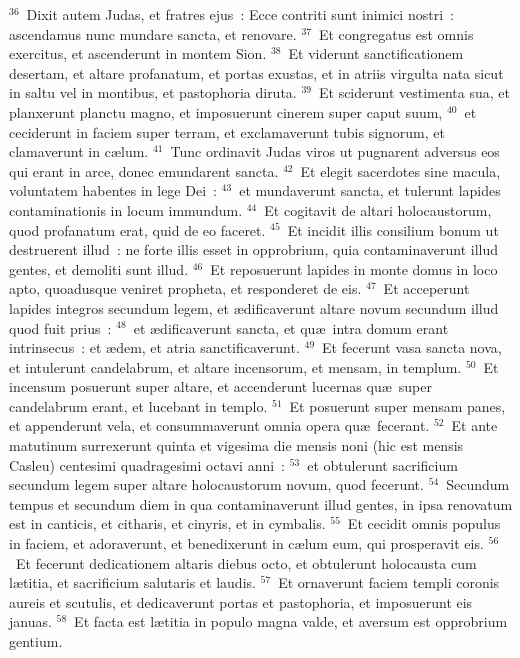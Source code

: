 ${}^{36}$~Dixit autem Judas, et fratres ejus~: Ecce contriti sunt inimici nostri~: ascendamus nunc mundare sancta, et renovare.
${}^{37}$~Et congregatus est omnis exercitus, et ascenderunt in montem Sion.
${}^{38}$~Et viderunt sanctificationem desertam, et altare profanatum, et portas exustas, et in atriis virgulta nata sicut in saltu vel in montibus, et pastophoria diruta.
${}^{39}$~Et sciderunt vestimenta sua, et planxerunt planctu magno, et imposuerunt cinerem super caput suum,
${}^{40}$~et ceciderunt in faciem super terram, et exclamaverunt tubis signorum, et clamaverunt in c\ae lum.
${}^{41}$~Tunc ordinavit Judas viros ut pugnarent adversus eos qui erant in arce, donec emundarent sancta.
${}^{42}$~Et elegit sacerdotes sine macula, voluntatem habentes in lege Dei~:
${}^{43}$~et mundaverunt sancta, et tulerunt lapides contaminationis in locum immundum.
${}^{44}$~Et cogitavit de altari holocaustorum, quod profanatum erat, quid de eo faceret.
${}^{45}$~Et incidit illis consilium bonum ut destruerent illud~: ne forte illis esset in opprobrium, quia contaminaverunt illud gentes, et demoliti sunt illud.
${}^{46}$~Et reposuerunt lapides in monte domus in loco apto, quoadusque veniret propheta, et responderet de eis.
${}^{47}$~Et acceperunt lapides integros secundum legem, et \ae dificaverunt altare novum secundum illud quod fuit prius~:
${}^{48}$~et \ae dificaverunt sancta, et qu\ae\ intra domum erant intrinsecus~: et \ae dem, et atria sanctificaverunt.
${}^{49}$~Et fecerunt vasa sancta nova, et intulerunt candelabrum, et altare incensorum, et mensam, in templum.
${}^{50}$~Et incensum posuerunt super altare, et accenderunt lucernas qu\ae\ super candelabrum erant, et lucebant in templo.
${}^{51}$~Et posuerunt super mensam panes, et appenderunt vela, et consummaverunt omnia opera qu\ae\ fecerant.
${}^{52}$~Et ante matutinum surrexerunt quinta et vigesima die mensis noni (hic est mensis Casleu) centesimi quadragesimi octavi anni~:
${}^{53}$~et obtulerunt sacrificium secundum legem super altare holocaustorum novum, quod fecerunt.
${}^{54}$~Secundum tempus et secundum diem in qua contaminaverunt illud gentes, in ipsa renovatum est in canticis, et citharis, et cinyris, et in cymbalis.
${}^{55}$~Et cecidit omnis populus in faciem, et adoraverunt, et benedixerunt in c\ae lum eum, qui prosperavit eis.
${}^{56}$~Et fecerunt dedicationem altaris diebus octo, et obtulerunt holocausta cum l\ae titia, et sacrificium salutaris et laudis.
${}^{57}$~Et ornaverunt faciem templi coronis aureis et scutulis, et dedicaverunt portas et pastophoria, et imposuerunt eis januas.
${}^{58}$~Et facta est l\ae titia in populo magna valde, et aversum est opprobrium gentium.
